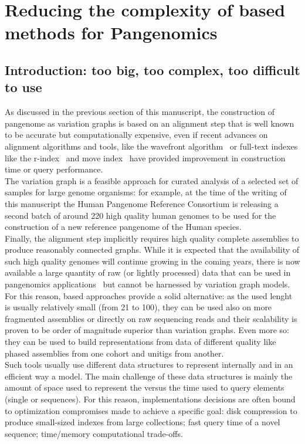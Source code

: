 \chapter{Reducing the complexity of \kmer based methods for Pangenomics}
\label{sec:complexity}

\section{Introduction: too big, too complex, too difficult to use}
As discussed in the previous section of this manuscript, the  construction of pangenome as variation graphs is based on an alignment step that is well known to be accurate but computationally expensive, even if recent advances on alignment algorithms and tools, like the wavefront algorithm~\cite{wavefront} or full-text indexes like the r-index~\cite{spumoni2} and move index~\cite{movi} have provided improvement in construction time or query performance.\\
The variation graph is a feasible approach for curated analysis of a selected set of samples for large genome organisms: for example, at the time of the writing of this manuscript the Human Pangenome Reference Consortium is releasing a second batch of around 220 high quality human genomes to be used for the construction of a new reference pangenome of the Human species.\\
Finally, the alignment step implicitly requires high quality complete assemblies to produce reasonably connected graphs. While it is expected that the availability of such high quality genomes will continue growing in the coming years, there is now available a large quantity of raw (or lightly processed) data that can be used in pangenomics applications~\cite{serratus,logan} but cannot be harnessed by variation graph models.\\ 
For this reason, \kmer based approaches provide a solid alternative: as the used \kmer lenght is usually relatively small (from 21 to 100), they can be used also on more fragmented assemblies or directly on raw sequencing reads and their scalability is proven to be order of magnitude superior than variation graphs. Even more so: they can be used to build representations from data of different quality like phased assemblies from one cohort and unitigs from another.\\
Such tools usually use different data structures to represent internally and in an efficient way a \dbg model. The main challenge of these data structures is mainly the amount of space used to represent the \kmers versus the time used to query elements (single \kmers or sequences). For this reason, implementations decisions are often bound to optimization compromises made to achieve a specific goal: disk compression to produce small-sized indexes from large collections; fast query time of a novel sequence; time/memory computational trade-offs.
